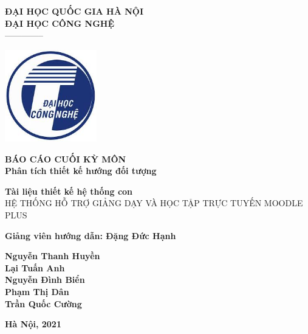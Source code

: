 \documentclass[./main.tex]{subfiles}
\begin{document}
\begin{titlepage}
	\begin{center}
		\textbf{ĐẠI HỌC QUỐC GIA HÀ NỘI}\\
		\textbf{ĐẠI HỌC CÔNG NGHỆ}\\
		--------------

		\vspace*{30pt}

		\includegraphics[width=0.3\textwidth]{./images/uet.jpg}

		\vspace*{50pt}

		\textbf{BÁO CÁO CUỐI KỲ MÔN
			\\ Phân tích thiết kế hướng đối tượng}
		\vspace*{30pt}

		\textbf{Tài liệu thiết kế hệ thống con\\}
		{\Large HỆ THỐNG HỖ TRỢ GIẢNG DẠY VÀ HỌC TẬP TRỰC TUYẾN MOODLE PLUS}

		\vspace*{50pt}

		\textbf{Giảng viên hướng dẫn: Đặng Đức Hạnh}

		\vspace*{30pt}

		\textbf{Nguyễn Thanh Huyền\\
			Lại Tuấn Anh\\
			Nguyễn Đình Biển\\
			Phạm Thị Dân\\
			Trần Quốc Cường\\
		}

		\vspace*{40pt}
	\end{center}

	\begin{center}
		\textbf{Hà Nội, 2021}
	\end{center}
\end{titlepage}
\end{document}
